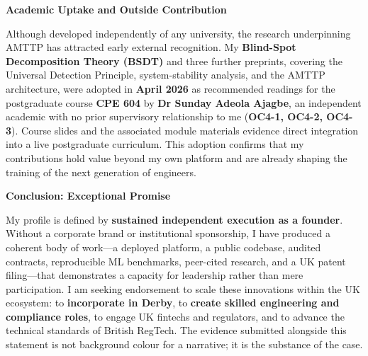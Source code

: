 \documentclass[12pt,a4paper]{article}
\begin{document}
\textbf{Academic Uptake and Outside Contribution}

Although developed independently of any university, the research underpinning AMTTP has attracted early external recognition. My \textbf{Blind-Spot Decomposition Theory (BSDT)} and three further preprints, covering the Universal Detection Principle, system-stability analysis, and the AMTTP architecture, were adopted in \textbf{April 2026} as recommended readings for the postgraduate course \textbf{CPE 604} by \textbf{Dr Sunday Adeola Ajagbe}, an independent academic with no prior supervisory relationship to me (\textbf{OC4-1, OC4-2, OC4-3}). Course slides and the associated module materials evidence direct integration into a live postgraduate curriculum. This adoption confirms that my contributions hold value beyond my own platform and are already shaping the training of the next generation of engineers.

\textbf{Conclusion: Exceptional Promise}

My profile is defined by \textbf{sustained independent execution as a founder}. Without a corporate brand or institutional sponsorship, I have produced a coherent body of work---a deployed platform, a public codebase, audited contracts, reproducible ML benchmarks, peer-cited research, and a UK patent filing---that demonstrates a capacity for leadership rather than mere participation. I am seeking endorsement to scale these innovations within the UK ecosystem: to \textbf{incorporate in Derby}, to \textbf{create skilled engineering and compliance roles}, to engage UK fintechs and regulators, and to advance the technical standards of British RegTech. The evidence submitted alongside this statement is not background colour for a narrative; it is the substance of the case.
\end{document}
